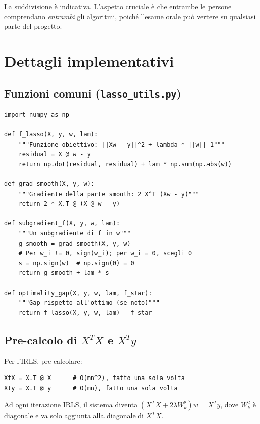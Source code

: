 \documentclass[a4paper,11pt]{article}
\begin{document}
\begin{tipbox}
La suddivisione è indicativa. L'aspetto cruciale è che entrambe le persone comprendano \emph{entrambi} gli algoritmi, poiché l'esame orale può vertere su qualsiasi parte del progetto.
\end{tipbox}

\section{Dettagli implementativi}
\label{sec:implementation}

\subsection{Funzioni comuni (\texttt{lasso\_utils.py})}
\label{subsec:lasso_utils}

\begin{verbatim}
import numpy as np

def f_lasso(X, y, w, lam):
    """Funzione obiettivo: ||Xw - y||^2 + lambda * ||w||_1"""
    residual = X @ w - y
    return np.dot(residual, residual) + lam * np.sum(np.abs(w))

def grad_smooth(X, y, w):
    """Gradiente della parte smooth: 2 X^T (Xw - y)"""
    return 2 * X.T @ (X @ w - y)

def subgradient_f(X, y, w, lam):
    """Un subgradiente di f in w"""
    g_smooth = grad_smooth(X, y, w)
    # Per w_i != 0, sign(w_i); per w_i = 0, scegli 0
    s = np.sign(w)  # np.sign(0) = 0
    return g_smooth + lam * s

def optimality_gap(X, y, w, lam, f_star):
    """Gap rispetto all'ottimo (se noto)"""
    return f_lasso(X, y, w, lam) - f_star
\end{verbatim}

\subsection{Pre-calcolo di \texorpdfstring{$X^TX$}{XTX} e \texorpdfstring{$X^Ty$}{XTy}}
Per l'IRLS, pre-calcolare:
\begin{verbatim}
XtX = X.T @ X      # O(mn^2), fatto una sola volta
Xty = X.T @ y      # O(mn), fatto una sola volta
\end{verbatim}
Ad ogni iterazione IRLS, il sistema diventa $(X^TX + 2\lambda W_k^2) w = X^Ty$, dove $W_k^2$ è diagonale e va solo aggiunta alla diagonale di $X^TX$.
\end{document}
